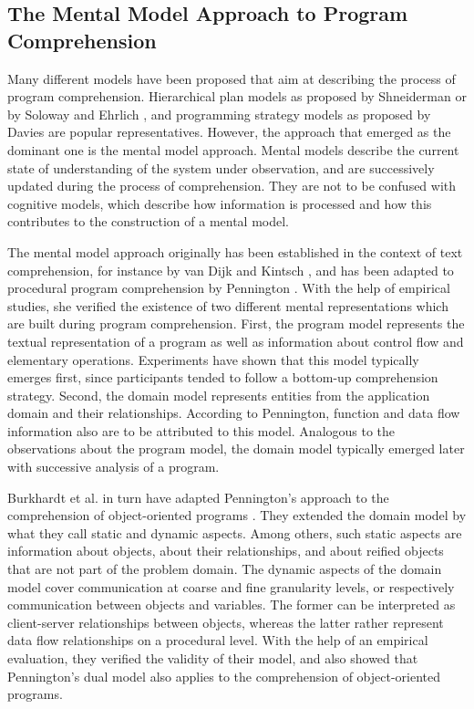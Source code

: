 \subsection{The Mental Model Approach to Program Comprehension}
\label{ss:BackgroundComprehensionMentalModel}
Many different models have been proposed that aim at describing the process of program comprehension.
Hierarchical plan models as proposed by Shneiderman \cite{shneiderman_exploratory_1976} or by Soloway and Ehrlich \cite{soloway_empirical_1984}, and programming strategy models as proposed by Davies \cite{davies_role_1991} are popular representatives.
However, the approach that emerged as the dominant one is the mental model approach.
Mental models describe the current state of understanding of the system under observation, and are successively updated during the process of comprehension.
They are not to be confused with cognitive models, which describe how information is processed and how this contributes to the construction of a mental model.

The mental model approach originally has been established in the context of text comprehension, for instance by van Dijk and Kintsch \cite{van_dijk_strategies_1983}, and has been adapted to procedural program comprehension by Pennington \cite{pennington_comprehension_1987, pennington_stimulus_1987}.
With the help of empirical studies, she verified the existence of two different mental representations which are built during program comprehension.
First, the program model represents the textual representation of a program as well as information about control flow and elementary operations.
Experiments have shown that this model typically emerges first, since participants tended to follow a bottom-up comprehension strategy.
Second, the domain model represents entities from the application domain and their relationships.
According to Pennington, function and data flow information also are to be attributed to this model.
Analogous to the observations about the program model, the domain model typically emerged later with successive analysis of a program.

Burkhardt et al. in turn have adapted Pennington's approach to the comprehension of object-oriented programs \cite{burkhardt_mental_1997}.
They extended the domain model by what they call static and dynamic aspects.
Among others, such static aspects are information about objects, about their relationships, and about reified objects that are not part of the problem domain.
The dynamic aspects of the domain model cover communication at coarse and fine  granularity levels, or respectively communication between objects and variables.
The former can be interpreted as client-server relationships between objects, whereas the latter rather represent data flow relationships on a procedural level.
With the help of an empirical evaluation, they verified the validity of their model, and also showed that Pennington's dual model also applies to the comprehension of object-oriented programs.

